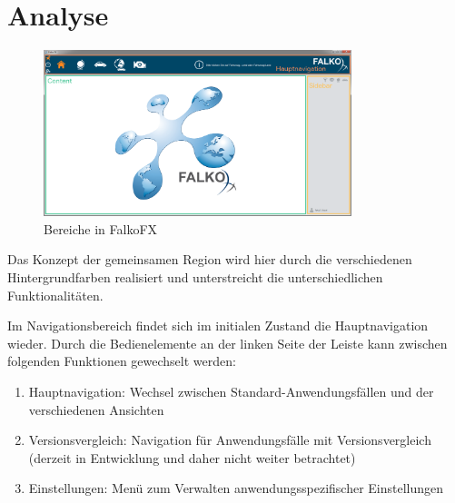 \section{Analyse}
\begin{figure}[H]
 \centering
 \includegraphics[width=0.8\textwidth]{grafiken/areas.png}
 \caption{Bereiche in FalkoFX}
 \label{fig:areas}
\end{figure}
Das Konzept der gemeinsamen Region wird hier durch die verschiedenen Hintergrundfarben realisiert und unterstreicht die unterschiedlichen Funktionalitäten.\par
{}
Im Navigationsbereich findet sich im initialen Zustand die Hauptnavigation wieder. Durch die Bedienelemente an der linken Seite der Leiste kann zwischen folgenden Funktionen gewechselt werden:
\begin{enumerate}
	\item Hauptnavigation: Wechsel zwischen Standard-Anwendungsfällen und der verschiedenen Ansichten
	\item Versionsvergleich: Navigation für Anwendungsfälle mit Versionsvergleich (derzeit in Entwicklung und daher nicht weiter betrachtet)
	\item Einstellungen: Menü zum Verwalten anwendungsspezifischer Einstellungen
\end{enumerate}
